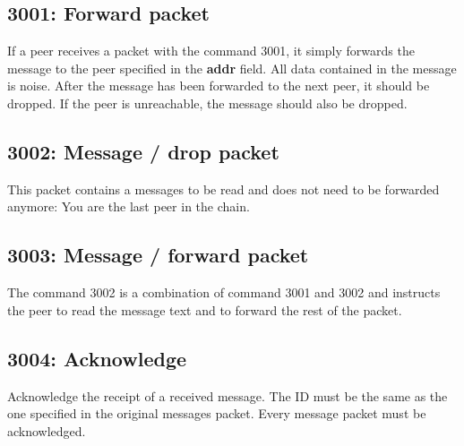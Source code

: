 \subsection{3001: Forward packet}
If a peer receives a packet with the command 3001, it simply forwards
the message to the peer specified in the \textbf{addr} field.
All data contained in the message
is noise. After the message has been forwarded to the next peer, it
should be dropped. If the peer is unreachable, the message should also
be dropped.
\subsection{3002: Message / drop packet}
This packet contains a messages to be read and does not need to be forwarded
anymore: You are the last peer in the chain.
\subsection{3003: Message / forward packet}
The command 3002 is a combination of command 3001 and 3002
and instructs the peer to read the message text and to forward the rest of
the packet.
\subsection{3004: Acknowledge}
Acknowledge the receipt of a received message. The ID must be the same as
the one specified in the original messages packet.
Every message packet must be acknowledged.
